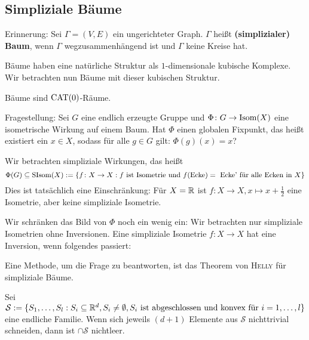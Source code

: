 \subsection{Simpliziale Bäume}
\label{subsec:3.1.1}

Erinnerung:
Sei $\Gamma = (V,E)$ ein ungerichteter Graph.
$\Gamma$ heißt \textbf{(simplizialer) Baum}, wenn $\Gamma$ wegzusammenhängend ist und $\Gamma$ keine Kreise hat. 

Bäume haben eine natürliche Struktur als $1$-dimensionale kubische Komplexe.
Wir betrachten nun Bäume mit dieser kubischen Struktur.

\begin{satz}
\label{satz:3.7}
	Bäume sind $\operatorname{CAT(0)}$-Räume. 
\end{satz}


%
%
%
%

Fragestellung:
Sei $G$ eine endlich erzeugte Gruppe und $\Phi\colon G \rightarrow \operatorname{Isom}(X)$ eine isometrische Wirkung auf einem Baum. 
Hat $\Phi$ einen globalen Fixpunkt, das heißt existiert ein $x \in X$, sodass für alle $g \in G$ gilt: $\Phi(g)(x)=x$?

Wir betrachten simpliziale Wirkungen, das heißt
\[
	\Phi(G) \subseteq \operatorname{SIsom}(X) := \{f\colon X \rightarrow X : f \text{ ist Isometrie und } f(\text{Ecke}) = \text{ Ecke' für alle Ecken in } X\}
\]
Dies ist tatsächlich eine Einschränkung: Für $X=\mathbb{R}$ ist $f\colon X \rightarrow X, x \mapsto x + \frac{1}{2}$ eine Isometrie, aber keine simpliziale Isometrie.

Wir schränken das Bild von $\Phi$ noch ein wenig ein:
Wir betrachten nur simpliziale Isometrien ohne Inversionen.
Eine simpliziale Isometrie $f \colon X \rightarrow X$ hat eine Inversion, wenn folgendes passiert: 

Eine Methode, um die Frage zu beantworten, ist das Theorem von \textsc{Helly} für simpliziale Bäume.

\begin{no-satz}
	Sei $\mathcal{S} := \{S_1, \dots, S_l : S_i \subseteq \mathbb{R}^d, S_i \neq \emptyset, S_i \text{ ist abgeschlossen und konvex für } i = 1, \dots, l\}$ eine endliche Familie.
	Wenn sich jeweils $(d+1)$ Elemente aus $\mathcal{S}$ nichttrivial schneiden, dann ist $\cap \mathcal{S}$ nichtleer.
\end{no-satz}

